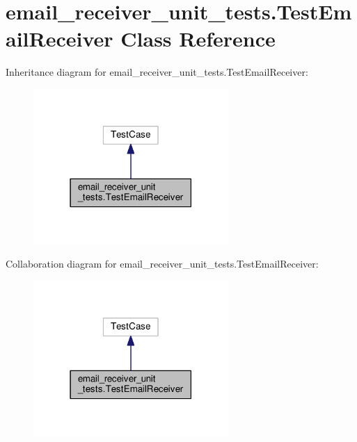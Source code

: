 \hypertarget{classemail__receiver__unit__tests_1_1TestEmailReceiver}{\section{email\-\_\-receiver\-\_\-unit\-\_\-tests.\-Test\-Email\-Receiver Class Reference}
\label{classemail__receiver__unit__tests_1_1TestEmailReceiver}
}


Inheritance diagram for email\-\_\-receiver\-\_\-unit\-\_\-tests.\-Test\-Email\-Receiver\-:
\nopagebreak
\begin{figure}[H]
\begin{center}
\leavevmode
\includegraphics[width=210pt]{classemail__receiver__unit__tests_1_1TestEmailReceiver__inherit__graph}
\end{center}
\end{figure}


Collaboration diagram for email\-\_\-receiver\-\_\-unit\-\_\-tests.\-Test\-Email\-Receiver\-:
\nopagebreak
\begin{figure}[H]
\begin{center}
\leavevmode
\includegraphics[width=210pt]{classemail__receiver__unit__tests_1_1TestEmailReceiver__coll__graph}
\end{center}
\end{figure}
